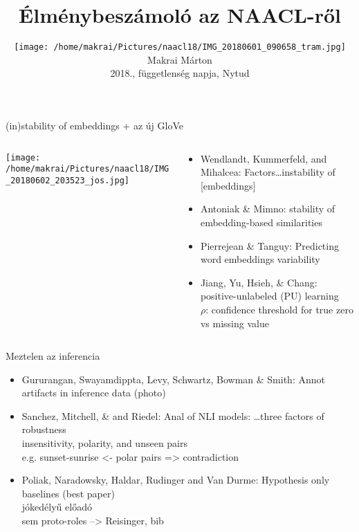 \documentclass{beamer}
\author[Makrai Márton]{
\texttt{[image: /home/makrai/Pictures/naacl18/IMG\_20180601\_090658\_tram.jpg]} \\
  Makrai Márton \\ 
  2018., függetlenség napja, Nytud}
\date[2018., függetlenség napja]{}
\title{Élménybeszámoló az NAACL-ről}
\begin{document}
\maketitle

\begin{frame}{(in)stability of embeddings + az új GloVe}
\begin{columns}\begin{column}{.35\textwidth}\centering
\texttt{[image: /home/makrai/Pictures/naacl18/IMG\_20180602\_203523\_jos.jpg]}\end{column}\begin{column}{.65\textwidth}
  \begin{itemize}
    \item Wendlandt, Kummerfeld, and Mihalcea: 
      Factors\dots  instability of [embeddings]
    \item Antoniak \& Mimno: stability of embedding-based similarities
    \item Pierrejean \& Tanguy: Predicting word embeddings variability 
    \item Jiang, Yu, Hsieh, \& Chang: positive-unlabeled (PU) learning %
      \\ $\rho$: confidence threshold for true zero vs missing value 
  \end{itemize}
\end{column}\end{columns}
\end{frame}

\begin{frame}{Meztelen az inferencia}
  \begin{itemize} 
    \item Gururangan, Swayamdippta, Levy, Schwartz, Bowman \& Smith: 
      Annot artifacts in inference data (photo)
    \item Sanchez, Mitchell, \& and Riedel: 
      Anal of NLI models: \dots   three factors of robustness
      \\ insensitivity, polarity, and unseen pairs
      \\ e.g. sunset-sunrise <- polar pairs => contradiction
    \item Poliak, Naradowsky, Haldar, Rudinger and Van Durme: 
      Hypothesis only baselines (best paper)
      \\ jókedélyű előadó
      \\ sem proto-roles --> Reisinger, bib 
  \end{itemize}
\end{frame}
\end{document}
